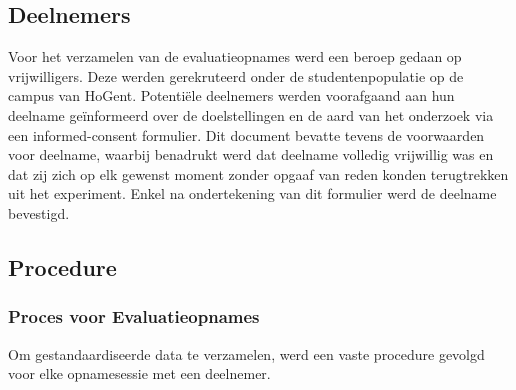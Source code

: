 \subsection{Deelnemers}

Voor het verzamelen van de evaluatieopnames werd een beroep gedaan op vrijwilligers. 
Deze werden gerekruteerd onder de studentenpopulatie op de campus van HoGent. 
Potentiële deelnemers werden voorafgaand aan hun deelname geïnformeerd over de doelstellingen en de aard van het onderzoek 
via een informed-consent formulier. Dit document bevatte tevens de voorwaarden voor deelname, 
waarbij benadrukt werd dat deelname volledig vrijwillig was en dat zij zich op elk gewenst moment zonder 
opgaaf van reden konden terugtrekken uit het experiment. 
Enkel na ondertekening van dit formulier werd de deelname bevestigd.

\subsection{Procedure}

\subsubsection{Proces voor Evaluatieopnames}

Om gestandaardiseerde data te verzamelen, werd een vaste procedure gevolgd voor elke opnamesessie met een deelnemer.

